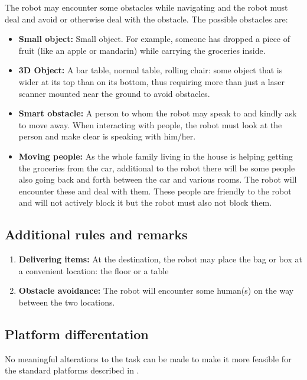 The robot may encounter some obstacles while navigating and the robot must deal and avoid or otherwise deal with the obstacle. 
The possible obstacles are:
\begin{itemize}
	\item \textbf{Small object:} Small object. For example, someone has dropped a piece of fruit (like an apple or mandarin) while carrying the groceries inside.
	\item \textbf{3D Object:} A bar table, normal table, rolling chair: some object that is wider at its top than on its bottom, 
	  thus requiring more than just a laser scanner mounted near the ground to avoid obstacles. 
	\item \textbf{Smart obstacle:} A person to whom the robot may speak to and kindly ask to move away. 
	  When interacting with people, the robot must look at the person and make clear is speaking with him/her.
	\item \textbf{Moving people:} As the whole family living in the house is helping getting the groceries from the car, 
	  additional to the robot there will be some people also going back and forth between the car and various rooms. 
	  The robot will encounter these and deal with them. These people are friendly to the robot and will not actively block it but the robot must also not block them. 
\end{itemize}

\subsection{Additional rules and remarks}
\begin{enumerate}
  \item \textbf{Delivering items:} At the destination, the robot may place the bag or box at a convenient location: the floor or a table
  \item \textbf{Obstacle avoidance:} The robot will encounter some human(s) on the way between the two locations.  
\end{enumerate}

\subsection{Platform differentation}
No meaningful alterations to the task can be made to make it more feasible for the standard platforms described in . 

